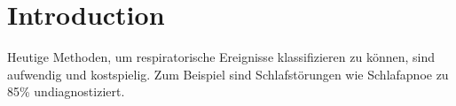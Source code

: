 
\chapter{Introduction}
\label{ch:Introduction}

Heutige Methoden, um respiratorische Ereignisse klassifizieren zu können, sind aufwendig und kostspielig. 
Zum Beispiel sind Schlafstörungen wie Schlafapnoe zu 85\% undiagnostiziert.
